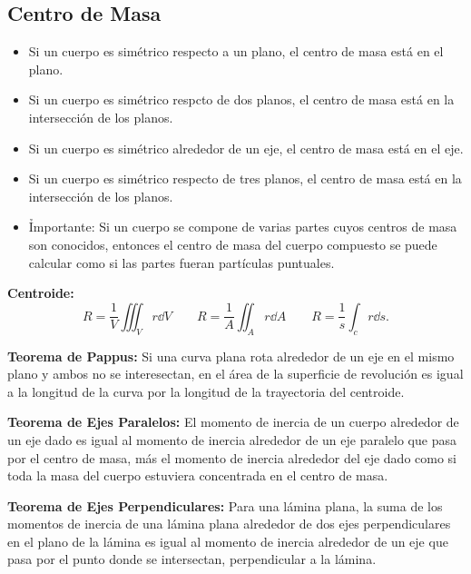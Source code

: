 \subsection{Centro de Masa}
\begin{itemize}
	\item Si un cuerpo es simétrico respecto a un plano, el centro de masa está en el plano.
	\item Si un cuerpo es simétrico respcto de dos planos, el centro de masa está en la intersección de los planos.
	\item Si un cuerpo es simétrico alrededor de un eje, el centro de masa está en el eje.
	\item Si un cuerpo es simétrico respecto de tres planos, el centro de masa está en la intersección de los planos.
	\item \h{Importante: } Si un cuerpo se compone de varias partes cuyos centros de masa son conocidos, entonces el centro de masa del cuerpo compuesto se puede calcular como si las partes fueran partículas puntuales.
\end{itemize}

\begin{definition}
	\textbf{Centroide: } \\
	\begin{equation}
		R = \frac{1}{V} \iiint _V r\dd{V} \qquad R = \frac{1}{A} \iint _A r\dd{A} \qquad R = \frac{1}{s} \int _c r\dd{s}.
	\end{equation}
\end{definition}


\begin{teorema}
	\textbf{Teorema de Pappus: } Si una curva plana rota alrededor de un eje en el mismo plano y ambos no se interesectan, en el área de la superficie de revolución es igual a la longitud de la curva por la longitud de la trayectoria del centroide.
\end{teorema}




\begin{teorema}
	\textbf{Teorema de Ejes Paralelos: } El momento de inercia de un cuerpo alrededor de un eje dado es igual al momento de inercia alrededor de un eje paralelo que pasa por el centro de masa, más el momento de inercia alrededor del eje dado como si toda la masa del cuerpo estuviera concentrada en el centro de masa.
\end{teorema}



\begin{teorema}
	\textbf{Teorema de Ejes Perpendiculares: } Para una lámina plana, la suma de los momentos de inercia de una lámina plana alrededor de dos ejes perpendiculares en el plano de la lámina es igual al momento de inercia alrededor de un eje que pasa por el punto donde se intersectan, perpendicular a la lámina.
\end{teorema}





